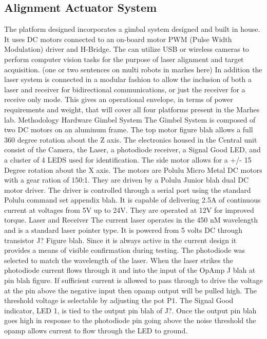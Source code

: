 \documentclass[botnum, fleqn]{unmeethesis}
\begin{document}
\subsection*{Alignment Actuator System}
The platform designed incorporates a gimbal system designed and built in house. It uses DC motors connected to an on-board motor PWM (Pulse Width Modulation) driver and H-Bridge. The  can utilize USB or wireless cameras to perform computer vision tasks for the purpose of laser alignment and target acquisition. (one  or two sentences on multi robots in marhes here) In addition the laser system is connected in a modular fashion to allow the inclusion of both a laser and receiver for bidirectional communications, or just the receiver for a receive only mode. This gives an operational envelope, in terms of power requirements and weight, that will cover all four platforms present in the Marhes lab.
Methodology
Hardware
Gimbel System
The Gimbel System is composed of two DC motors on an aluminum frame. The top motor {figure blah} allows a full 360 degree rotation about the Z axis. The electronics housed in the Central unit consist of the Camera, the Laser, a photodiode receiver, a Signal Good LED, and a cluster of 4 LEDS used for identification. The side motor allows for a +/- 15 Degree rotation about the X axis. 
The motors are Polulu Micro Metal DC motors with a gear ration of 150:1. They are driven by a Polulu Junior blah dual DC motor driver. The driver is controlled through a serial port using the standard Polulu command set {appendix blah}. It is capable of delivering 2.5A of continuous current at voltages from 5V up to 24V. They are operated at 12V for improved torque. 
Laser and Receiver
The current laser operates in the 450 nM wavelength and is a standard laser pointer type. It is powered from 5 volts DC through transistor J? {Figure blah}. Since it is always active in the current design it provides a means of visible confirmation during testing. 
The photodiode was selected to match the wavelength of the laser. When the laser strikes the photodiode current flows through it and into the input of the OpAmp J blah at pin blah {figure}. If sufficient current is allowed to pass through to drive the voltage at the pin above the negative input then opamp output will be pulled high. The threshold voltage is selectable by adjusting the pot P1. 
The Signal Good indicator, LED 1, is tied to the output pin {blah} of J?. Once the output pin blah goes high in response to the photodiode pin going above the noise threshold the opamp allows current to flow through the LED to ground.
\end{document}

